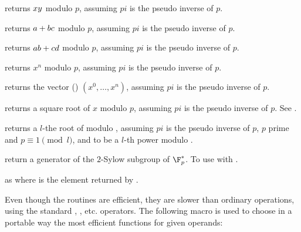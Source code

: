  returns $x\*y$
modulo $p$, assuming $pi$ is the pseudo inverse of $p$.

returns $a+b\*c$ modulo $p$, assuming $pi$ is the pseudo inverse of $p$.

returns $a\*b+c\*d$ modulo $p$, assuming $pi$ is the pseudo inverse of $p$.

 returns
$x^n$ modulo $p$, assuming $pi$ is the pseudo inverse of $p$.

 returns
the vector () $(x^0, \dots, x^n)$, assuming $pi$ is
the pseudo inverse of $p$.

 returns a square root
of $x$ modulo $p$, assuming $pi$ is the pseudo inverse of $p$.
See .

returns a $l$-the root of 
modulo , assuming $pi$ is the pseudo inverse of $p$,
$p$ prime and $p \equiv 1 \pmod{l}$, and  to be a $l$-th power modulo
.

 return a generator of
the $2$-Sylow subgroup of $\F_p^*$. To use with .

as  where  is the element returned by
.


Even though the  routines are efficient, they are slower than
ordinary  operations, using the standard \kbd{+}, \kbd{\%}, etc.
operators.
The following macro is used to choose in a portable way the most efficient
functions for given operands:

